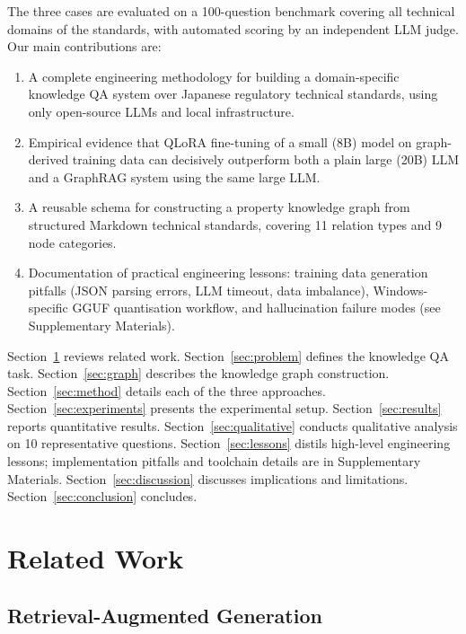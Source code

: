 \documentclass[twocolumn]{article}
\begin{document}
The three cases are evaluated on a 100-question benchmark covering all technical domains of the
standards, with automated scoring by an independent LLM judge.
Our main contributions are:

\begin{enumerate}
  \item A complete engineering methodology for building a domain-specific knowledge QA system
        over Japanese regulatory technical standards, using only open-source LLMs and local
        infrastructure.
  \item Empirical evidence that QLoRA fine-tuning of a small (8B) model on graph-derived
        training data can decisively outperform both a plain large (20B) LLM and a GraphRAG
        system using the same large LLM.
  \item A reusable schema for constructing a property knowledge graph from structured Markdown
        technical standards, covering 11 relation types and 9 node categories.
  \item Documentation of practical engineering lessons: training data generation pitfalls
        (JSON parsing errors, LLM timeout, data imbalance), Windows-specific GGUF
        quantisation workflow, and hallucination failure modes
        (see Supplementary Materials).
\end{enumerate}

Section~\ref{sec:related} reviews related work.
Section~\ref{sec:problem} defines the knowledge QA task.
Section~\ref{sec:graph} describes the knowledge graph construction.
Section~\ref{sec:method} details each of the three approaches.
Section~\ref{sec:experiments} presents the experimental setup.
Section~\ref{sec:results} reports quantitative results.
Section~\ref{sec:qualitative} conducts qualitative analysis on 10 representative questions.
Section~\ref{sec:lessons} distils high-level engineering lessons;
implementation pitfalls and toolchain details are in Supplementary Materials.
Section~\ref{sec:discussion} discusses implications and limitations.
Section~\ref{sec:conclusion} concludes.

\section{Related Work}
\label{sec:related}

\subsection{Retrieval-Augmented Generation}
\end{document}
